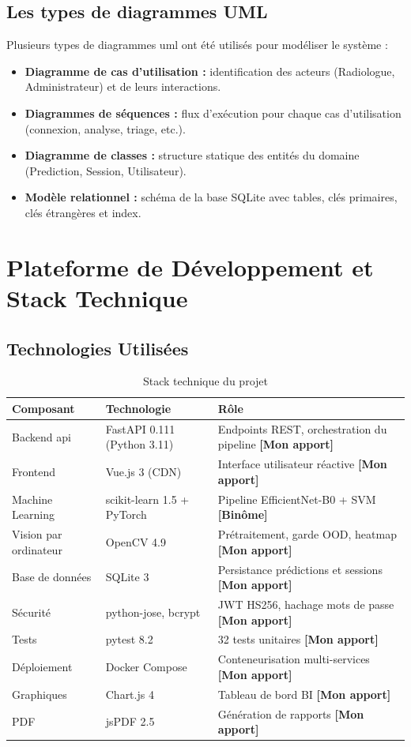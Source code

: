 \documentclass[12pt, a4paper]{report}
\newcommand{\mypart}{\textbf{[Mon apport]}}
\newcommand{\binpart}{\textbf{[Binôme]}}
\begin{document}
\subsection{Les types de diagrammes UML}

Plusieurs types de diagrammes \acrfull{uml} ont été utilisés pour modéliser
le système :
\begin{itemize}
  \item \textbf{Diagramme de cas d'utilisation :} identification des acteurs
        (Radiologue, Administrateur) et de leurs interactions.
  \item \textbf{Diagrammes de séquences :} flux d'exécution pour chaque
        cas d'utilisation (connexion, analyse, triage, etc.).
  \item \textbf{Diagramme de classes :} structure statique des entités
        du domaine (Prediction, Session, Utilisateur).
  \item \textbf{Modèle relationnel :} schéma de la base SQLite avec tables,
        clés primaires, clés étrangères et index.
\end{itemize}
\newpage
\section{Plateforme de Développement et Stack Technique}

\subsection{Technologies Utilisées}

\begin{table}[H]
\centering
\caption{Stack technique du projet}
\begin{tabularx}{\textwidth}{L{3cm} L{3.5cm} X}
\toprule
\textbf{Composant} & \textbf{Technologie} & \textbf{Rôle} \\
\midrule
Backend \acrshort{api} & FastAPI 0.111 (Python 3.11) & Endpoints REST, orchestration du pipeline \mypart \\
Frontend & Vue.js 3 (CDN) & Interface utilisateur réactive \mypart \\
Machine Learning & scikit-learn 1.5 + PyTorch & Pipeline EfficientNet-B0 + SVM \binpart \\
Vision par ordinateur & OpenCV 4.9 & Prétraitement, garde OOD, heatmap \mypart \\
Base de données & SQLite 3 & Persistance prédictions et sessions \mypart \\
Sécurité & python-jose, bcrypt & JWT HS256, hachage mots de passe \mypart \\
Tests & pytest 8.2 & 32 tests unitaires \mypart \\
Déploiement & Docker Compose & Conteneurisation multi-services \mypart \\
Graphiques & Chart.js 4 & Tableau de bord BI \mypart \\
PDF & jsPDF 2.5 & Génération de rapports \mypart \\
\bottomrule
\end{tabularx}
\end{table}
\end{document}
